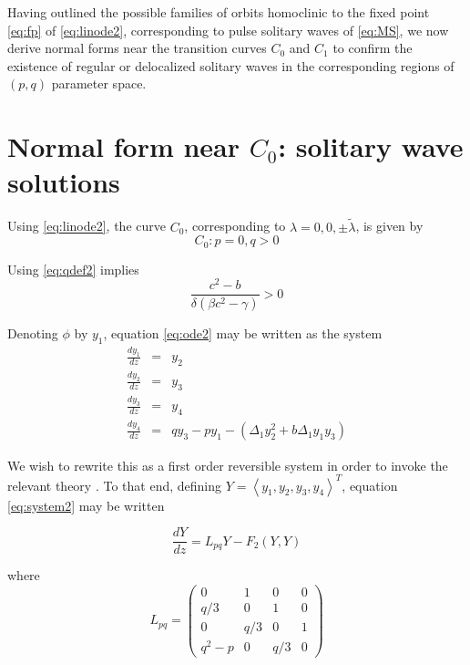 Having outlined the possible families of orbits homoclinic to the fixed point \eqref{eq:fp} of \eqref{eq:linode2},
corresponding to pulse solitary waves of \eqref{eq:MS}, we now derive normal forms near the transition curves $C_0$ and $C_1$
to confirm the existence of regular or delocalized solitary waves in the corresponding regions of $\left(p,q\right)$ parameter space.

\section{Normal form near $C_0$: solitary wave solutions}

Using \eqref{eq:linode2}, the curve $C_0$, corresponding to $\lambda = 0,0,\pm \tilde{ \lambda } $, is given by
\begin{equation}
C_0: { p=0, q > 0 }
\end{equation}

Using \eqref{eq:qdef2} implies
\begin{equation}
 \frac{c^2 - b}{\delta\left(\beta c^2 - \gamma\right)} > 0
\end{equation}

Denoting $\phi$ by $y_1$, equation \eqref{eq:ode2} may be written as the system
\begin{subequations}\label{eq:system2}
\begin{eqnarray}
\frac{d y_1 }{d z} &=& y_2 \\
\frac{d y_2 }{d z} &=& y_3 \\
\frac{d y_3 }{d z} &=& y_4 \\
\frac{d y_4 }{d z} &=& q y_3 - p y_1 - \left(\Delta_1 y_2^2 + b \Delta_1 y_1 y_3 \right)
\end{eqnarray}
\end{subequations}

We wish to rewrite this as a first order reversible system in order to invoke the relevant theory \cite{IA}. 
To that end, defining  $Y=\left<y_1,y_2,y_3,y_4\right>^T$, equation \eqref{eq:system2} may be written 

\begin{equation}\label{eq:bilinear2}
\frac{ dY }{ dz } = L_{pq} Y - F_2(Y,Y)
\end{equation}

where 
\begin{equation}
L_{pq} = \left( 
\begin{array}{cccc}
0&1&0&0\\
q/3&0&1&0\\
0&q/3&0&1\\
q^2 - p &0&q/3&0 \end{array} \right) \end{equation}

